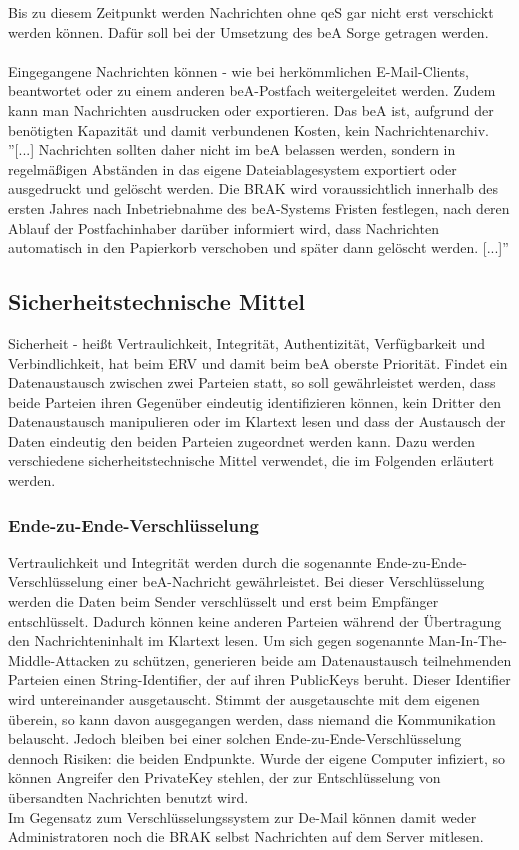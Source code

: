 Bis zu diesem Zeitpunkt werden Nachrichten ohne qeS gar nicht erst verschickt werden können. Dafür soll bei der Umsetzung des beA Sorge getragen werden. \\
\\
Eingegangene Nachrichten können - wie bei herkömmlichen E-Mail-Clients, beantwortet oder zu einem anderen beA-Postfach weitergeleitet werden. Zudem kann man Nachrichten ausdrucken oder exportieren. Das beA ist, aufgrund der benötigten Kapazität und damit verbundenen Kosten, kein Nachrichtenarchiv. ''[...] Nachrichten sollten daher nicht im beA belassen werden, sondern in regelmäßigen Abständen in das eigene Dateiablagesystem exportiert oder ausgedruckt und gelöscht werden. Die BRAK wird voraussichtlich innerhalb des ersten Jahres nach Inbetriebnahme des beA-Systems Fristen festlegen, nach deren Ablauf der Postfachinhaber darüber informiert wird, dass Nachrichten automatisch in den Papierkorb verschoben und später dann gelöscht werden. [...]'' \textcite{bea:bea:brak3-2015}

\subsection{Sicherheitstechnische Mittel}
Sicherheit - heißt Vertraulichkeit, Integrität, Authentizität, Verfügbarkeit und Verbindlichkeit, hat beim ERV und damit beim beA oberste Priorität. Findet ein Datenaustausch zwischen zwei Parteien statt, so soll gewährleistet werden, dass beide Parteien ihren Gegenüber eindeutig identifizieren können, kein Dritter den Datenaustausch manipulieren oder im Klartext lesen und dass der Austausch der Daten eindeutig den beiden Parteien zugeordnet werden kann. Dazu werden verschiedene sicherheitstechnische Mittel verwendet, die im Folgenden erläutert werden.

\subsubsection{Ende-zu-Ende-Verschlüsselung}
Vertraulichkeit und Integrität werden durch die sogenannte Ende-zu-Ende-Verschlüsselung einer beA-Nachricht gewährleistet. Bei dieser Verschlüsselung werden die Daten beim Sender verschlüsselt und erst beim Empfänger entschlüsselt. Dadurch können keine anderen Parteien während der Übertragung den Nachrichteninhalt im Klartext lesen. Um sich gegen sogenannte Man-In-The-Middle-Attacken zu schützen, generieren beide am Datenaustausch teilnehmenden Parteien einen String-Identifier, der auf ihren PublicKeys beruht. Dieser Identifier wird untereinander ausgetauscht. Stimmt der ausgetauschte mit dem eigenen überein, so kann davon ausgegangen werden, dass niemand die Kommunikation belauscht. Jedoch bleiben bei einer solchen Ende-zu-Ende-Verschlüsselung dennoch Risiken: die beiden Endpunkte. Wurde der eigene Computer infiziert, so können Angreifer den PrivateKey stehlen, der zur Entschlüsselung von übersandten Nachrichten benutzt wird. \\
Im Gegensatz zum Verschlüsselungssystem zur De-Mail können damit weder Administratoren noch die BRAK selbst Nachrichten auf dem Server mitlesen.

